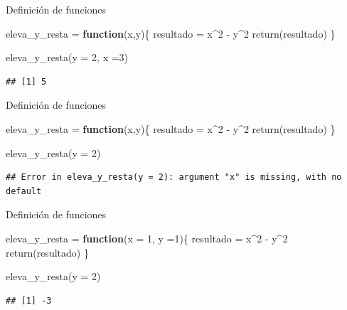 \documentclass[
  ignorenonframetext,
]{beamer}
\newenvironment{Shaded}{\begin{snugshade}}{\end{snugshade}}
\newcommand{\AttributeTok}[1]{\textcolor[rgb]{0.77,0.63,0.00}{#1}}
\newcommand{\ControlFlowTok}[1]{\textcolor[rgb]{0.13,0.29,0.53}{\textbf{#1}}}
\newcommand{\DecValTok}[1]{\textcolor[rgb]{0.00,0.00,0.81}{#1}}
\newcommand{\FunctionTok}[1]{\textcolor[rgb]{0.00,0.00,0.00}{#1}}
\newcommand{\NormalTok}[1]{#1}
\newcommand{\OtherTok}[1]{\textcolor[rgb]{0.56,0.35,0.01}{#1}}
\newcommand{\SpecialCharTok}[1]{\textcolor[rgb]{0.00,0.00,0.00}{#1}}
\begin{document}
\begin{frame}[fragile]{Definición de funciones}
\protect\hypertarget{definiciuxf3n-de-funciones-3}{}
\begin{Shaded}
\begin{Highlighting}[]
\NormalTok{eleva\_y\_resta }\OtherTok{=} \ControlFlowTok{function}\NormalTok{(x,y)\{}
\NormalTok{  resultado }\OtherTok{=}\NormalTok{ x}\SpecialCharTok{\^{}}\DecValTok{2} \SpecialCharTok{{-}}\NormalTok{ y}\SpecialCharTok{\^{}}\DecValTok{2}
  \FunctionTok{return}\NormalTok{(resultado)}
\NormalTok{\}}

\FunctionTok{eleva\_y\_resta}\NormalTok{(}\AttributeTok{y =} \DecValTok{2}\NormalTok{, }\AttributeTok{x =}\DecValTok{3}\NormalTok{)}
\end{Highlighting}
\end{Shaded}

\begin{verbatim}
## [1] 5
\end{verbatim}
\end{frame}

\begin{frame}[fragile]{Definición de funciones}
\protect\hypertarget{definiciuxf3n-de-funciones-4}{}
\begin{Shaded}
\begin{Highlighting}[]
\NormalTok{eleva\_y\_resta }\OtherTok{=} \ControlFlowTok{function}\NormalTok{(x,y)\{}
\NormalTok{  resultado }\OtherTok{=}\NormalTok{ x}\SpecialCharTok{\^{}}\DecValTok{2} \SpecialCharTok{{-}}\NormalTok{ y}\SpecialCharTok{\^{}}\DecValTok{2}
  \FunctionTok{return}\NormalTok{(resultado)}
\NormalTok{\}}

\FunctionTok{eleva\_y\_resta}\NormalTok{(}\AttributeTok{y =} \DecValTok{2}\NormalTok{)}
\end{Highlighting}
\end{Shaded}

\begin{verbatim}
## Error in eleva_y_resta(y = 2): argument "x" is missing, with no default
\end{verbatim}
\end{frame}

\begin{frame}[fragile]{Definición de funciones}
\protect\hypertarget{definiciuxf3n-de-funciones-5}{}
\begin{Shaded}
\begin{Highlighting}[]
\NormalTok{eleva\_y\_resta }\OtherTok{=} \ControlFlowTok{function}\NormalTok{(}\AttributeTok{x =} \DecValTok{1}\NormalTok{, }\AttributeTok{y =}\DecValTok{1}\NormalTok{)\{}
\NormalTok{  resultado }\OtherTok{=}\NormalTok{ x}\SpecialCharTok{\^{}}\DecValTok{2} \SpecialCharTok{{-}}\NormalTok{ y}\SpecialCharTok{\^{}}\DecValTok{2}
  \FunctionTok{return}\NormalTok{(resultado)}
\NormalTok{\}}

\FunctionTok{eleva\_y\_resta}\NormalTok{(}\AttributeTok{y =} \DecValTok{2}\NormalTok{)}
\end{Highlighting}
\end{Shaded}

\begin{verbatim}
## [1] -3
\end{verbatim}
\end{frame}
\end{document}
